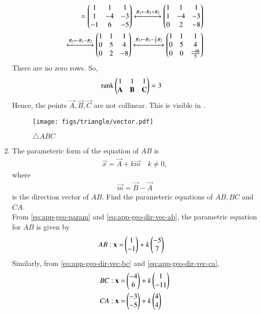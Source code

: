 \begin{enumerate}[label=\thesubsection.\arabic*.,ref=\thesubsection.\theenumi]
\begin{align}
{    } 
    =
    \begin{pmatrix}
    1 & 1 & 1
    \\
    1 & -4 & -3
    \\
    -1 & 6 & -5
    \end{pmatrix}
     \xleftrightarrow[]{R_3 \leftarrow R_3+R_2}
    \begin{pmatrix}
    1 & 1 & 1
    \\
    1 & -4 & -3
    \\
    0 & 2 & -8 
    \end{pmatrix}
    \\
     \xleftrightarrow[]{R_2\leftarrow R_1-R_2}
    \begin{pmatrix}
    1 & 1 & 1
    \\
    0 & 5 & 4
    \\
    0 & 2 & -8 
    \end{pmatrix}
     \xleftrightarrow[]{R_3\leftarrow R_3-\frac{2}{5}R_2}
    \begin{pmatrix}
    1 & 1 & 1
    \\
    0 & 5 & 4
    \\
    0 & 0 & \frac{-48}{5}
    \end{pmatrix}
\end{align}
There are no zero rows. So,
\begin{align}
    \text{rank}\begin{pmatrix}
    1 & 1 & 1\\
    \mathbf{A} & \mathbf{B} & \mathbf{C} \\
    \end{pmatrix} &= 3 
\end{align}  
Hence,  the points $\vec{A},\vec{B},\vec{C}$ are not collinear. 
This is visible in 
.
\begin{figure}[H]
\centering
\texttt{[image: figs/triangle/vector.pdf]}
\caption{$\triangle ABC$}
\label{fig1:Triangle}
\end{figure}
\item The parameteric form of the equation  of $AB$ is 
		\begin{align}
			\label{eq:app-geo-param}
			\vec{x}=\vec{A}+k\vec{m} \quad k \ne 0,
		\end{align}
		where
		\begin{align}
\vec{m}=\vec{B}-\vec{A}
		\end{align}
is the direction vector of $AB$.
Find the parameteric equations of $AB, BC$ and $CA$.
\\
\solution
From 
			\eqref{eq:app-geo-param} and
		\eqref{eq:app-geo-dir-vec-ab},
the parametric equation for $AB$ is given by
\begin{align}
AB: \mathbf{x} = &\begin{pmatrix}1\\-1\end{pmatrix} + k \begin{pmatrix}-5\\7\end{pmatrix}
\end{align}
Similarly, from 
		\eqref{eq:app-geo-dir-vec-bc} and
		\eqref{eq:app-geo-dir-vec-ca},
\begin{align}
BC: \mathbf{x} = &\begin{pmatrix}-4\\6\end{pmatrix} + k \begin{pmatrix}1\\-11\end{pmatrix}\\
CA: \mathbf{x} = &\begin{pmatrix}-3\\-5\end{pmatrix} + k \begin{pmatrix}4\\4\end{pmatrix}
\end{align}


\end{enumerate}
